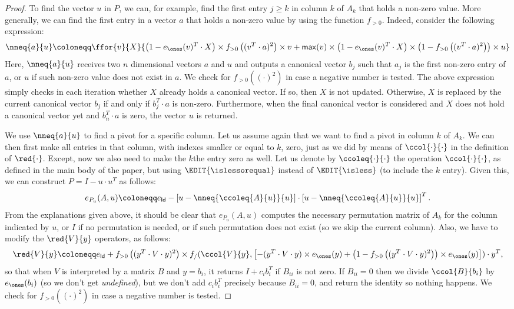 \begin{proof}
To find the vector $u$ in $P$, we can, for example, find the first entry $j\geq k$ in column $k$ of $A_k$ that holds a non-zero value. More generally, we can find the first entry in a vector $a$ that holds a non-zero value by using the function $f_{>0}$. Indeed, consider the following expression:
$$
\nneq{a}{u}\coloneqq \ffor{v}{X}{\left( 1-e_{\ones}(v)^T\cdot X \right) \times f_{>0}\left( ( v^T\cdot a )^2 \right)\times v + \mathsf{max}(v)\times\left( 1-e_{\ones}(v)^T\cdot X \right)\times \left( 1 - f_{>0}\left( ( v^T\cdot a )^2 \right) \right) \times u}
$$
Here, $\nneq{a}{u}$ receives two $n$ dimensional vectors $a$ and $u$ and outputs a 
canonical vector $b_j$ such that $a_j$ is the first non-zero entry of $a$, or $u$ if such non-zero value does not exist in $a$. We check for $f_{>0}((\cdot)^2)$ 
in case a negative number is tested. The above expression simply checks in each iteration
whether $X$ already holds a canonical vector. If so, then $X$ is not updated. Otherwise,
$X$ is replaced by the current canonical vector $b_j$ if and only if $b_j^T\cdot a$ is non-zero. Furthermore, when the final canonical vector is considered and $X$ does not hold
a canonical vector yet and $b_n^T\cdot a$ is zero, the vector $u$ is returned.

We use $\nneq{a}{u}$ to find a pivot for a specific column. Let us assume again that we
want to find a pivot in column $k$ of $A_k$. We can then first make all entries in that column, with indexes smaller or equal to $k$, zero, just as we did by means of $\ccol{\cdot}{\cdot}$ in the
definition of $\red{\cdot}$. Except, now we also need to make the $k$the entry zero as well.
Let us denote by $\ccoleq{\cdot}{\cdot}$ the operation $\ccol{\cdot}{\cdot}$, as defined in the main body of the paper, but using $\EDIT{\islessorequal}$ instead of $\EDIT{\isless}$ (to include the $k$ entry). Given this, we can construct $P=I-u\cdot u^T$ as follows:
$$
e_{P_u}(A,u) \coloneqq  e_{\mathsf{Id}} - \left[ u - \nneq{ \ccoleq{A}{u} }{u} \right]\cdot \left[ u - \nneq{ \ccoleq{A}{u} }{u} \right]^T.
$$ 
From the explanations given above, it should be clear that $e_{P_u}(A,u)$ computes the necessary permutation matrix of $A_k$ for the column indicated by $u$, or $I$
if no permutation is needed, or if such permutation does not exist (so we skip the current column). Also, we have to modify the $\red{V}{y}$ operators, as follows:
$$
\red{V}{y}\coloneqq  e_{\mathsf{Id}}+ f_{>0}\left( ( y^T\cdot V\cdot y)^2 \right)\times f_/(\ccol{V}{y},\left[ -(y^T\cdot V\cdot y)\times e_{\ones}(y) + \left( 1 - f_{>0}\left( ( y^T\cdot V\cdot y)^2 \right) \right)\times e_{\ones}(y) \right])\cdot y^T,
$$
so that when $V$ is interpreted by a matrix $B$ and $y=b_i$, it returns $I+c_ib_i^T$ if $B_{ii}$ is not zero. 
If $B_{ii}=0$ then we divide $\ccol{B}{b_i}$ by $e_{\ones}(b_i)$ (so we don't get \textit{undefined}), 
but we don't add $c_ib_i^T$ precisely because $B_{ii}=0$, and return the identity so nothing happens. We check 
for $f_{>0}((\cdot)^2)$ in case a negative number is tested.


\end{proof}
